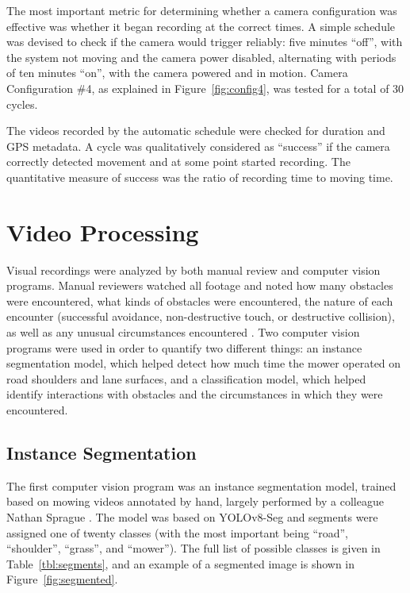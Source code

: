 \documentclass[
]{article}
\begin{document}
The most important metric for determining whether a camera configuration
was effective was whether it began recording at the correct times. A
simple schedule was devised to check if the camera would trigger
reliably: five minutes ``off'', with the system not moving and the
camera power disabled, alternating with periods of ten minutes ``on'',
with the camera powered and in motion. Camera Configuration \#4, as
explained in Figure~\ref{fig:config4}, was tested for a total of 30
cycles.

The videos recorded by the automatic schedule were checked for duration
and GPS metadata. A cycle was qualitatively considered as ``success'' if
the camera correctly detected movement and at some point started
recording. The quantitative measure of success was the ratio of
recording time to moving time.

\section{Video Processing}\label{sec:methods_video}

Visual recordings were analyzed by both manual review and computer
vision programs. Manual reviewers watched all footage and noted how many
obstacles were encountered, what kinds of obstacles were encountered,
the nature of each encounter (successful avoidance, non-destructive
touch, or destructive collision), as well as any unusual circumstances
encountered \parencite{Sprague_AnalyzingVideoIsobus_2024}. Two computer
vision programs were used in order to quantify two different things: an
instance segmentation model, which helped detect how much time the mower
operated on road shoulders and lane surfaces, and a classification
model, which helped identify interactions with obstacles and the
circumstances in which they were encountered.

\subsection{Instance Segmentation}\label{instance-segmentation}

The first computer vision program was an instance segmentation model,
trained based on mowing videos annotated by hand, largely performed by a
colleague Nathan Sprague \parencite{Sprague_ProgramAnnotateVideos_2024}.
The model was based on YOLOv8-Seg
\parencite{Jocher_UltralyticsYolov8_2023} and segments were assigned one
of twenty classes (with the most important being ``road'', ``shoulder'',
``grass'', and ``mower''). The full list of possible classes is given in
Table~\ref{tbl:segments}, and an example of a segmented image is shown
in Figure~\ref{fig:segmented}.
\end{document}
